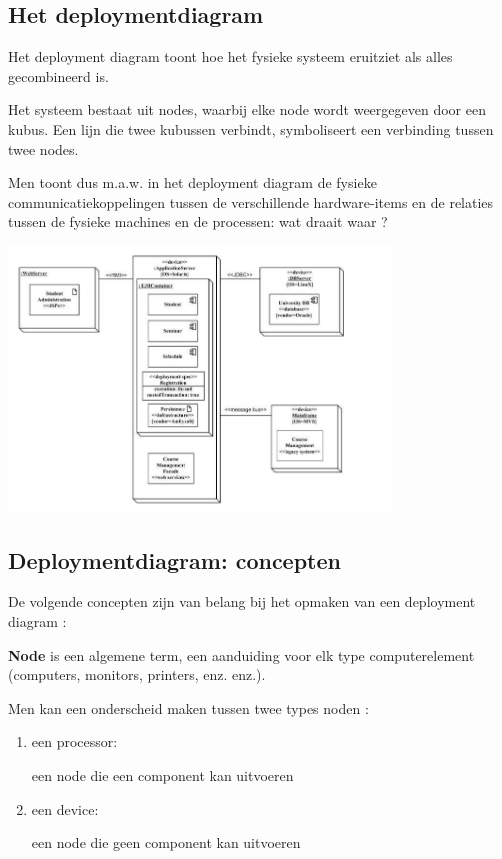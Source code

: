 
\subsection{Het deploymentdiagram}

Het deployment diagram toont hoe het fysieke systeem eruitziet als alles gecombineerd is.

Het systeem bestaat uit nodes, waarbij elke node wordt weergegeven door een kubus. Een lijn die twee kubussen verbindt, symboliseert een verbinding tussen twee nodes.

Men toont dus m.a.w. in het deployment diagram de fysieke communicatiekoppelingen tussen de verschillende hardware-items en de relaties tussen de fysieke machines en de processen: wat draait waar ?



\begin{center}
\includegraphics[width=4in]{img/deployment}%
\label{labelname}%
\end{center}


\subsection{Deploymentdiagram: concepten}

De volgende concepten zijn van belang bij het opmaken van een deployment diagram :


\textbf{Node} is een algemene term, een aanduiding voor elk type computerelement (computers, monitors, printers, enz. enz.).

Men kan een onderscheid maken tussen twee types noden :

\begin{enumerate}
    \item een processor:
    
    een node die een component kan uitvoeren
    \item een device:
    
    een node die geen component kan uitvoeren
    
\end{enumerate}

